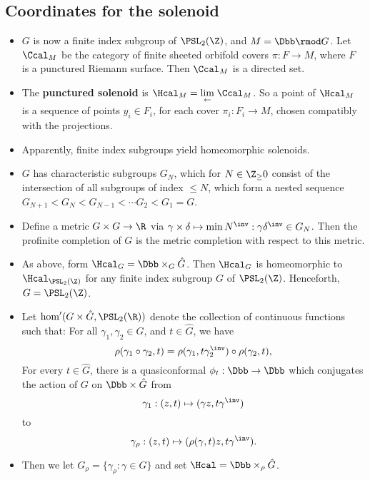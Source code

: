 \documentclass[11pt]{amsart}
\begin{document}
	\subsection{Coordinates for the solenoid}
	\begin{itemize}
  		\item $G$ is now a finite index subgroup of $\PSL_2(\Z)$, and $M=\Dbb \rmod G$. Let $\Ccal_M$ be the category of finite sheeted orbifold covers $\pi:F \to M$, where $F$ is a punctured Riemann surface. Then $\Ccal_M$ is a directed set.
  		\item The \textbf{punctured solenoid} is $\Hcal_M = \underset{\leftarrow}\lim \; \Ccal_M$. So a point of $\Hcal_M$ is a sequence of points $y_i \in F_i$, for each cover $\pi_i:F_i \to M$, chosen compatibly with the projections.
  		\item Apparently, finite index subgroups yield homeomorphic solenoids.
  		\item $G$ has characteristic subgroups $G_N$, which for $N\in \Z_\geq 0$ consist of the intersection of all subgroups of index $\leq N$, which form a nested sequence $G_{N+1} <G_N<G_{N-1}<\cdots G_2<G_1=G$.
  		\item Define a metric $G\times G \to \R$ via $\gamma \times \delta \mapsto \min{ N^\inv: \gamma \delta^\inv \in G_N }$. Then the profinite completion of $G$ is the metric completion with respect to this metric. 
  		\item As above, form $\Hcal_G= \Dbb\times_G \hat{G}$. Then $\Hcal_G$ is homeomorphic to $\Hcal_{\PSL_2(\Z)}$ for any finite index subgroup $G$ of $\PSL_2(\Z)$. Henceforth, $G=\PSL_2(\Z)$. 
  		\item Let $\hom'(G\times \hat{G}, \PSL_2(\R))$ denote the collection of continuous functions such that:
  			  For all $\gamma_1,\gamma_2\in G$, and $t\in \hat{G}$, we have \[\rho(\gamma_1 \circ \gamma_2, t) = \rho(\gamma_1, t\gamma_2^\inv) \circ \rho(\gamma_2,t), \] 
  			 For every $t\in \hat{G}$, there is a quasiconformal $\phi_t: \Dbb \to \Dbb$ which conjugates the action of $G$ on $\Dbb\times \hat{G}$ from 
	  			\begin{equation*}
  					\gamma_1:(z,t) \mapsto (\gamma z, t \gamma^\inv) 
				\end{equation*}
				to
				\begin{equation*}
  					\gamma_\rho: (z, t) \mapsto (\rho(\gamma,t) z,t\gamma^\inv).
				\end{equation*}
		\item Then we let $G_\rho= \{ \gamma_\rho: \gamma \in G\}$ and set $\Hcal=\Dbb \times_\rho \hat{G}$.

\end{itemize}
\end{document}
